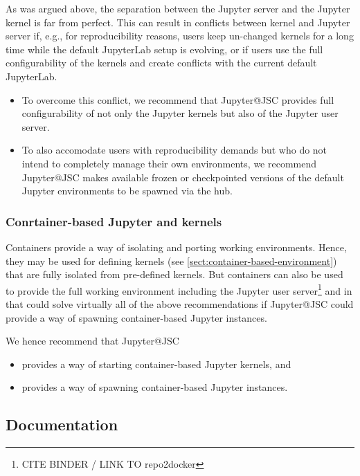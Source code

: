 As was argued above, the separation between the Jupyter server and the Jupyter kernel is far from perfect.
This can result in conflicts between kernel and Jupyter server if, e.g., for reproducibility reasons, users keep un-changed kernels for a long time while the default JupyterLab setup is evolving, or if users use the full configurability of the kernels and create conflicts with the current default JupyterLab.

\begin{itemize}
  \item To overcome this conflict, we recommend that Jupyter@JSC provides full configurability of not only the Jupyter kernels but also of the Jupyter user server.
  \item To also accomodate users with reproducibility demands but who do not intend to completely manage their own environments, we recommend Jupyter@JSC makes available frozen or checkpointed versions of the default Jupyter environments to be spawned via the hub.
\end{itemize}

\subsubsection{Conrtainer-based Jupyter and kernels}

Containers provide a way of isolating and porting working environments.
Hence, they may be used for defining kernels (see \ref{sect:container-based-environment}) that are fully isolated from pre-defined kernels.
But containers can also be used to provide the full working environment including the Jupyter user server\footnote{CITE BINDER / LINK TO repo2docker} and in that could solve virtually all of the above recommendations if Jupyter@JSC could provide a way of spawning container-based Jupyter instances.

We hence recommend that Jupyter@JSC
\begin{itemize}
  \item provides a way of starting container-based Jupyter kernels, and
  \item provides a way of spawning container-based Jupyter instances.
\end{itemize}

\subsection{Documentation}

